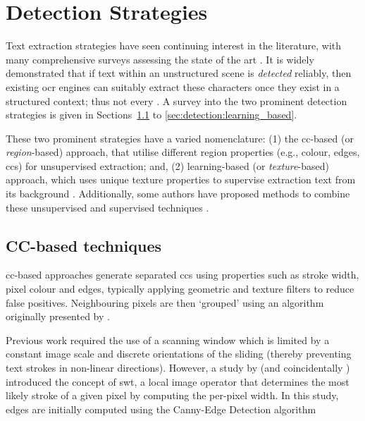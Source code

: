 \section{Detection Strategies}
\label{sec:background:detection_strategies}

Text extraction strategies have seen continuing interest in the literature, with many comprehensive surveys assessing the state of the art \cite{Chen:2000ua, Jung:2004uwa, Zhang:2008vfa, Liang:2005uy, Jung:2004uw}. It is widely demonstrated that if text within an unstructured scene is \textit{detected} reliably, then existing \gls{ocr} engines can suitably extract these characters \citep{Smith:2007dc} once they exist in a structured context; thus not every . A survey into the two prominent detection strategies is given in Sections~\ref{sec:detection:cc_based} to \ref{sec:detection:learning_based}.

These two prominent strategies have a varied nomenclature: (1) the \gls{cc}-based (or \textit{region}-based) approach, that utilise different region properties (e.g., colour, edges, \glspl{cc}) \citep{Jain:1998wd, Kim:1996tw, Liu:2006wh, Chen:2011ul, Li:2012wd, Zhang:2011cl, Shivakumara:2011dn, Epshtein:2010tj, Zhang:2010wa, Shivakumara:2010wu, Liu:2008tz, Subramanian:2007tf, Lee:2010vv, Sun:2010tg} for unsupervised extraction; and, (2) learning-based (or \textit{texture}-based) approach, which uses unique texture properties to supervise extraction text from its background \citep{Wang:2009vp, Hanif:2009tm, Tu:2003tg, Ye:2005wu, Lee:2003cn, XiangrongChen:2004ha, Chen:2005wv}. Additionally, some authors have proposed methods to combine these unsupervised and supervised techniques \citep{Mutch:2006ub, Mairal:2008uw, Bengio:2006vb}.

\subsection{CC-based techniques}
\label{sec:detection:cc_based}

\gls{cc}-based approaches generate separated \glspl{cc} using properties such as stroke width, pixel colour and edges, typically applying geometric and texture filters to reduce false positives. Neighbouring pixels are then `grouped' using an algorithm originally presented by \citet{Horn:1986vc}. 

Previous work required the use of a scanning window \citep{XiangrongChen:2004ha, Lienhart:2002ub, Jung:2009do} which is limited by a constant image scale and discrete orientations of the sliding (thereby preventing text strokes in non-linear directions). However, a study by \citet{Epshtein:2010tj} (and coincidentally \citet{Zhang:2011cl}) introduced the concept of \gls{swt}, a local image operator that determines the most likely stroke of a given pixel by computing the per-pixel width. In this study, edges are initially computed using the Canny-Edge Detection algorithm \citet{Canny:1986uw}

